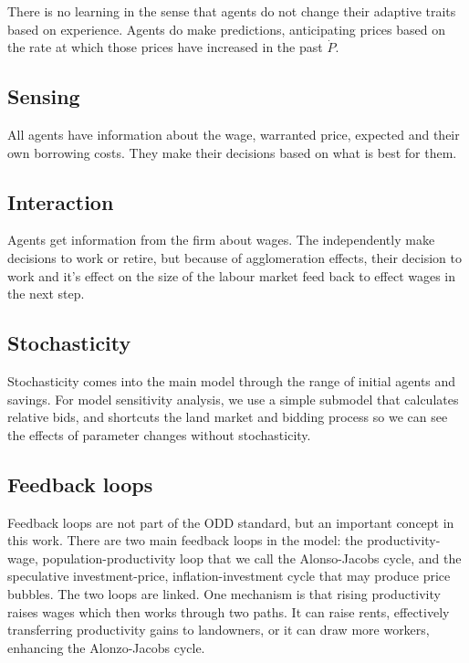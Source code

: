 

There is no learning in the sense that agents do not change their adaptive traits based on experience. 
Agents do make predictions, anticipating prices based on the rate at which those prices have increased in the past $\dot P$.

\subsection{Sensing}
All agents have information about the wage, warranted price, expected and their own borrowing costs. They make their decisions based on what is best for them. 

\subsection{Interaction}
Agents get information from the firm about wages. The independently make decisions to work or retire, but because of agglomeration effects, their decision to work and it's effect on the size of the labour market feed back to effect wages in the next step. 

\subsection{Stochasticity}
Stochasticity comes into the main model through the range of initial agents and savings. For model sensitivity analysis, we use a simple submodel that calculates relative bids, and shortcuts the land market and bidding process so we can see the effects of parameter changes without stochasticity. 

\subsection{Feedback loops}
Feedback loops are not part of the ODD standard, but an important concept in this work. 
There are two main \glspl{feedback loop} in the model: the productivity-wage, population-productivity loop that we call the Alonso-Jacobs cycle, and the speculative investment-price, inflation-investment cycle that may produce price bubbles. 
The two loops are linked. One mechanism is that rising productivity raises wages which then works through two paths. It can raise rents, effectively transferring productivity gains to landowners, or it can draw more workers, enhancing the \Gls{Alonzo-Jacobs cycle}. 

